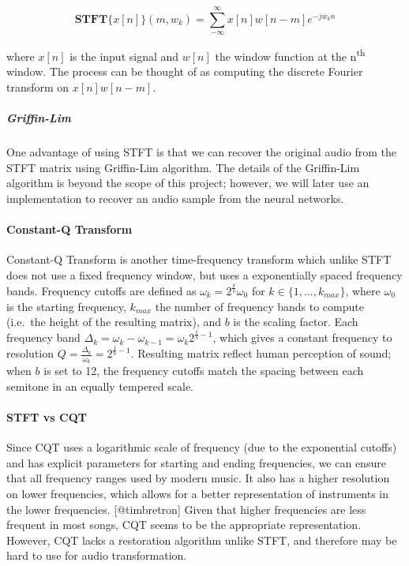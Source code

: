 \documentclass[]{article}
\begin{document}
\begin{equation}
    \mathbf{STFT}\{x[n]\}(m, w_k) = \sum_{-\infty}^{\infty} x[n]w[n - m]e^{-jw_kn}
\end{equation}

where \(x[n]\) is the input signal and \(w[n]\) the window function at
the n\textsuperscript{th} window. The process can be thought of as
computing the discrete Fourier transform on \(x[n]w[n - m]\).

\subparagraph{Griffin-Lim}

One advantage of using STFT is that we can recover the original audio
from the STFT matrix using Griffin-Lim algorithm. The details of the
Griffin-Lim algorithm is beyond the scope of this project; however, we
will later use an implementation to recover an audio sample from the
neural networks.

\paragraph{Constant-Q Transform}

Constant-Q Transform is another time-frequency transform which unlike
STFT does not use a fixed frequency window, but uses a exponentially
spaced frequency bands. Frequency cutoffs are defined as
\(\omega_k = 2^{\frac{k}{b}} \omega_0\) for
\(k \in \{ 1, ..., k_{max}\}\), where \(\omega_0\) is the starting
frequency, \(k_{max}\) the number of frequency bands to compute
(i.e.~the height of the resulting matrix), and \(b\) is the scaling
factor. Each frequency band
\(\Delta_k = \omega_k - \omega_{k-1} = \omega_k 2^{\frac{1}{b} - 1}\),
which gives a constant frequency to resolution
\(Q = \frac{\Delta_k}{\omega_k} = 2^{\frac{1}{b} -1}\). Resulting matrix
reflect human perception of sound; when \(b\) is set to 12, the
frequency cutoffs match the spacing between each semitone in an equally
tempered scale.

\paragraph{STFT vs CQT}

Since CQT uses a logarithmic scale of frequency (due to the exponential
cutoffs) and has explicit parameters for starting and ending
frequencies, we can ensure that all frequency ranges used by modern
music. It also has a higher resolution on lower frequencies, which
allows for a better representation of instruments in the lower
frequencies. {[}@timbretron{]} Given that higher frequencies are less
frequent in most songs, CQT seems to be the appropriate representation.
However, CQT lacks a restoration algorithm unlike STFT, and therefore
may be hard to use for audio transformation.
\end{document}
